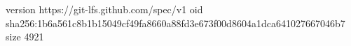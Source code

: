 version https://git-lfs.github.com/spec/v1
oid sha256:1b6a561c8b1b15049cf49fa8660a88fd3e673f00d8604a1dca641027667046b7
size 4921

